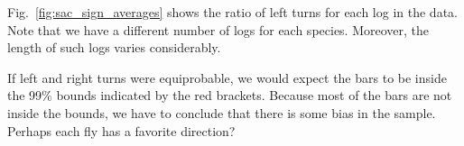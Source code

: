 
Fig.~\ref{fig:sac_sign_averages} shows the ratio of left turns for each log in the data. Note that we have a different number of logs for each species. Moreover, the length of such logs varies considerably. 

If left and right turns were equiprobable, we would expect the bars to be inside the 99\% bounds indicated by the red brackets. Because most of the bars are not inside the bounds, we have to conclude that there is some bias in the sample. Perhaps each fly has a favorite direction?

